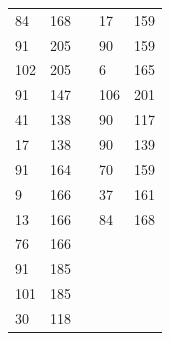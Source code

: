 \documentclass[11pt]{article}
\begin{document}
\begin{table}[h]
\begin{tabular}{|l|l|lll}
\cellcolor[HTML]{E3E5F9}84 & \cellcolor[HTML]{DDF4DC}168 & \multicolumn{1}{l|}{} & \multicolumn{1}{l|}{\cellcolor[HTML]{E3E5F9}17} & \multicolumn{1}{l|}{159} \\ \cline{1-2} \cline{4-5} 
\cellcolor[HTML]{E3E5F9}91 & 205 & \multicolumn{1}{l|}{} & \multicolumn{1}{l|}{\cellcolor[HTML]{E3E5F9}90} & \multicolumn{1}{l|}{159} \\ \cline{1-2} \cline{4-5} 
102 & 205 & \multicolumn{1}{l|}{} & \multicolumn{1}{l|}{\cellcolor[HTML]{E3E5F9}6} & \multicolumn{1}{l|}{165} \\ \cline{1-2} \cline{4-5} 
\cellcolor[HTML]{E3E5F9}91 & \cellcolor[HTML]{DDF4DC}147 & \multicolumn{1}{l|}{} & \multicolumn{1}{l|}{106} & \multicolumn{1}{l|}{201} \\ \cline{1-2} \cline{4-5} 
41 & 138 & \multicolumn{1}{l|}{} & \multicolumn{1}{l|}{\cellcolor[HTML]{E3E5F9}90} & \multicolumn{1}{l|}{117} \\ \cline{1-2} \cline{4-5} 
\cellcolor[HTML]{E3E5F9}17 & 138 & \multicolumn{1}{l|}{} & \multicolumn{1}{l|}{\cellcolor[HTML]{E3E5F9}90} & \multicolumn{1}{l|}{139} \\ \cline{1-2} \cline{4-5} 
\cellcolor[HTML]{E3E5F9}91 & 164 & \multicolumn{1}{l|}{} & \multicolumn{1}{l|}{70} & \multicolumn{1}{l|}{159} \\ \cline{1-2} \cline{4-5} 
9 & 166 & \multicolumn{1}{l|}{} & \multicolumn{1}{l|}{37} & \multicolumn{1}{l|}{161} \\ \cline{1-2} \cline{4-5} 
13 & 166 & \multicolumn{1}{l|}{} & \multicolumn{1}{l|}{\cellcolor[HTML]{E3E5F9}84} & \multicolumn{1}{l|}{\cellcolor[HTML]{DDF4DC}168} \\ \cline{1-2} \cline{4-5} 
76 & 166 &  &  &  \\ \cline{1-2}
\cellcolor[HTML]{E3E5F9}91 & \cellcolor[HTML]{DDF4DC}185 &  &  &  \\ \cline{1-2}
101 & \cellcolor[HTML]{DDF4DC}185 &  &  &  \\ \cline{1-2}
30 & 118 &  &  &  \\ \cline{1-2}
\end{tabular}
\end{table}
\vspace{-1cm}
\end{document}
